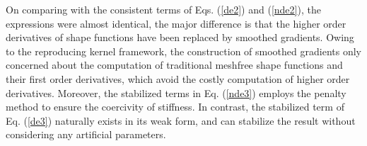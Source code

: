 On comparing with the consistent terms of Eqs. (\ref{de2}) and (\ref{nde2}), the expressions were almost identical, the major difference is that the higher order derivatives of shape functions have been replaced by smoothed gradients. Owing to the reproducing kernel framework, the construction of smoothed gradients only concerned about the computation of traditional meshfree shape functions and their first order derivatives, which avoid the costly computation of higher order derivatives. Moreover, the stabilized terms in Eq. (\ref{nde3}) employs the penalty method \DIFaddbegin {}\DIFaddend to ensure the coercivity of stiffness\DIFaddbegin {}\DIFaddend . In contrast, the stabilized term of Eq. (\ref{de3}) naturally exists in its weak form, and can stabilize the result without considering any artificial parameters.

